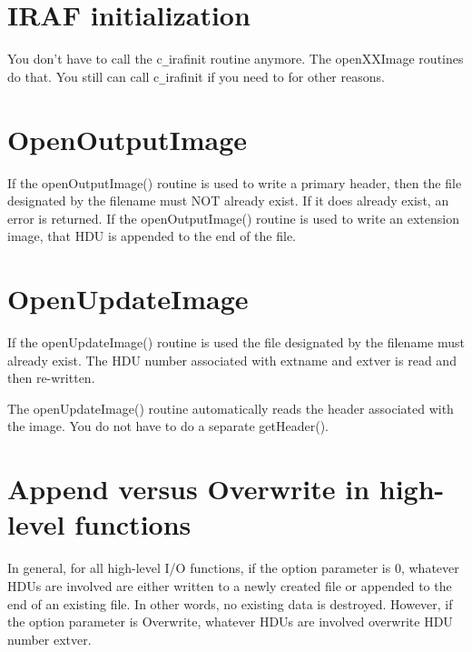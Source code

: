\section {
IRAF initialization
}

You don't have to call the c\verb+_+irafinit routine anymore.  The openXXImage
routines do that.  You still can call c\verb+_+irafinit if you need to for
other reasons.


\section {
OpenOutputImage
}

If the openOutputImage() routine is used to write a primary header,
then the file designated by the filename must NOT already exist.  If it
does already exist, an error is returned.  If the openOutputImage() 
routine is used to write an extension image, that HDU is appended to the
end of the file.


\section {
OpenUpdateImage
}

If the openUpdateImage() routine is used the file designated by the
filename must already exist.  The HDU number associated with extname and
extver is read and then re-written.

The openUpdateImage() routine automatically reads the header associated
with the image.  You do not have to do a separate getHeader().


\section {
Append versus Overwrite in high-level functions
}

In general, for all high-level I/O functions, if the option parameter
is 0, whatever HDUs are involved are either written to a newly created
file or appended to the end of an existing file.  In other words, no
existing data is destroyed.  However, if the option parameter is
Overwrite, whatever HDUs are involved overwrite HDU number extver.

